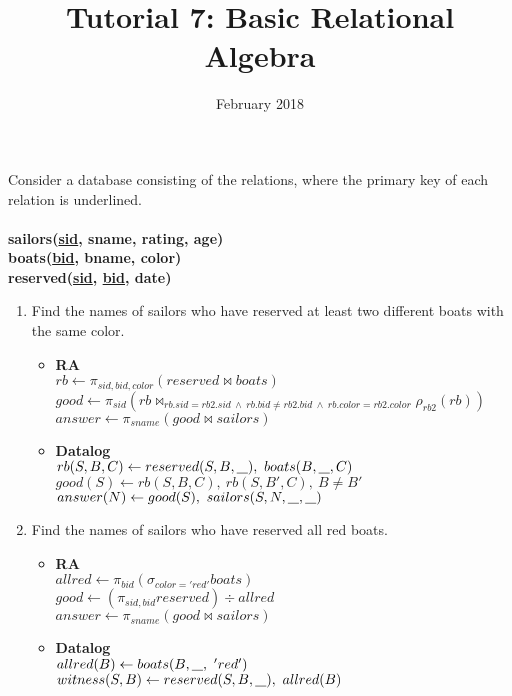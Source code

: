 \documentclass{article}
\title{Tutorial 7: Basic Relational Algebra}
\date{February 2018}
\newcommand{\anyvar}{\underline{\hspace{0.8em}}}
\newcommand{\RA}{\textbf{RA}}
\newcommand{\DL}{\textbf{Datalog}}
\begin{document}
	\maketitle

\noindent Consider a database consisting of the relations, where the primary key of each relation is
underlined.\\
\\
\textbf{sailors(\underline{sid}, sname, rating, age)}\\
\textbf{boats(\underline{bid}, bname, color)}\\
\textbf{reserved(\underline{sid}, \underline{bid}, date)}\\

\begin{enumerate}
\item Find the names of sailors who have reserved at least two different boats with the same color.
	\begin{itemize}
	\item \RA\\
	$rb \gets \pi_{sid, bid, color} (reserved \bowtie boats) $\\
	$good \gets \pi_{sid} (rb \bowtie_{rb.sid = rb2.sid\ \land \ rb.bid \neq rb2.bid\ \land \ rb.color = rb2.color} \rho_{rb2}(rb) )$\\
	$answer \gets \pi_{sname} (good \bowtie sailors)$
	\item \DL \\
	$ rb(S, B, C) \gets reserved(S, B, \anyvar ),\ boats(B, \anyvar , C) $\\
	$ good(S) \gets rb(S, B, C),\ rb(S, B', C),\ B \neq B' $\\
	$ answer(N) \gets good(S),\ sailors(S, N, \anyvar, \anyvar)$
	\end{itemize}
\item Find the names of sailors who have reserved all red boats.
	\begin{itemize}
	\item \RA \\
	$ allred \gets \pi_{bid} (\sigma_{color = 'red'} boats)$ \\
	$ good \gets (\pi_{sid, bid} reserved) \div allred $\\
	$ answer \gets \pi_{sname}(good \bowtie sailors)$
	\item \DL \\
	$ allred(B) \gets boats(B, \anyvar,\  'red') $\\
	$ witness(S, B) \gets reserved(S, B, \anyvar),\ allred(B) $ \\

\end{itemize}
\end{enumerate}
\end{document}
